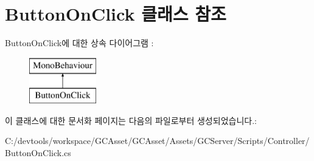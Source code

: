 \hypertarget{class_button_on_click}{}\section{Button\+On\+Click 클래스 참조}
\label{class_button_on_click}
Button\+On\+Click에 대한 상속 다이어그램 \+: \begin{figure}[H]
\begin{center}
\leavevmode
\includegraphics[height=2.000000cm]{class_button_on_click}
\end{center}
\end{figure}


이 클래스에 대한 문서화 페이지는 다음의 파일로부터 생성되었습니다.\+:\begin{DoxyCompactItemize}
\item 
C\+:/devtools/workspace/\+G\+C\+Asset/\+G\+C\+Asset/\+Assets/\+G\+C\+Server/\+Scripts/\+Controller/Button\+On\+Click.\+cs\end{DoxyCompactItemize}
